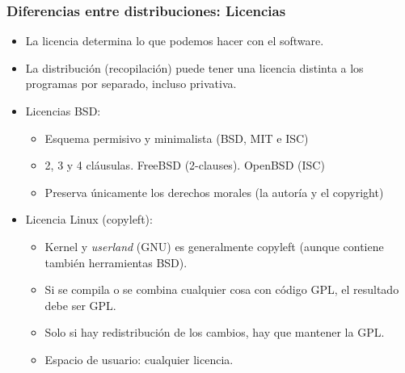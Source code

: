 \documentclass{beamer}
\begin{document}

\begin{frame}
\frametitle{Diferencias entre distribuciones: Licencias}


\begin{itemize}
\item La licencia determina lo que podemos hacer con el software.
\item La distribución (recopilación) puede tener una licencia distinta a los programas por separado, incluso privativa.
\item \alert{Licencias BSD:} 

\begin{itemize}
\item Esquema permisivo y minimalista (BSD, MIT e ISC)
\item 2, 3 y 4 cláusulas. FreeBSD (2-clauses). OpenBSD (ISC)
\item Preserva únicamente los derechos morales (la autoría y el copyright)
\end{itemize}

\item \alert{Licencia Linux} (copyleft): 

\begin{itemize}
\item Kernel y \textit{userland} (GNU) es generalmente copyleft (aunque contiene también herramientas BSD).
\item Si se compila o se combina cualquier cosa con código GPL, el resultado debe ser GPL.
\item Solo si hay redistribución de los cambios, hay que mantener la GPL.
\item Espacio de usuario: cualquier licencia.
\end{itemize}


\end{itemize}

\end{frame}



\end{document}
